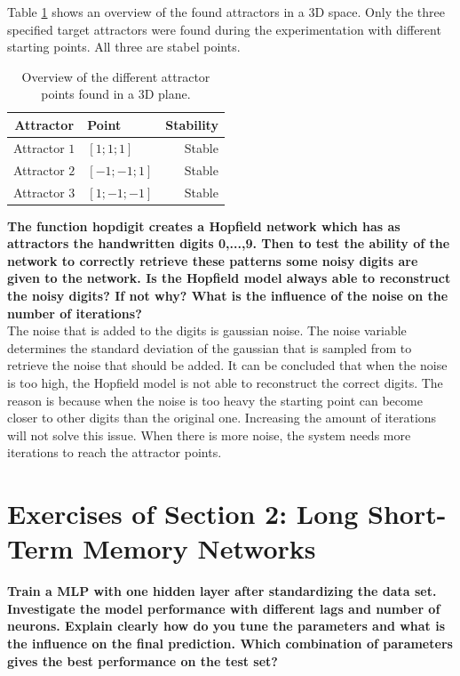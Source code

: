 \documentclass[a4paper,10pt]{article}
\begin{document}
Table \ref{tab:att3} shows an overview of the found attractors in a 3D space. Only the three specified target attractors were found during the experimentation with different starting points. All three are stabel points. 
\begin{table}
	\centering
	\begin{tabular}{@{}clr@{}} \toprule
		\textbf{Attractor} & \textbf{Point} & \textbf{Stability}\\\midrule
		Attractor $ 1 $ & $ [1;1;1] $ & Stable\\
		Attractor $ 2 $ & $ [-1;-1;1] $ & Stable\\
		Attractor $ 3 $ & $ [1;-1;-1] $ & Stable\\\bottomrule
	\end{tabular}
	\caption{Overview of the different attractor points found in a 3D plane.}
	\label{tab:att3}
\end{table}
\newpage
\textbf{The function hopdigit creates a Hopfield network which has as attractors the handwritten digits 0,...,9. Then to test
	the ability of the network to correctly retrieve these patterns some noisy digits are given to the network. Is the Hopfield
	model always able to reconstruct the noisy digits? If not why? What is the influence of the noise on the number of
	iterations?}\\

The noise that is added to the digits is gaussian noise. The noise variable determines the standard deviation of the gaussian that is sampled from to retrieve the noise that should be added. It can be concluded that when the noise is too high, the Hopfield model is not able to reconstruct the correct digits. The reason is because when the noise is too heavy the starting point can become closer to other digits than the original one. Increasing the amount of iterations will not solve this issue. When there is more noise, the system needs more iterations to reach the attractor points.

\section{Exercises of Section 2: Long Short-Term Memory Networks}
\textbf{Train a MLP with one hidden layer after standardizing the data set. Investigate the model
performance with different lags and number of neurons. Explain clearly how do you tune the parameters and what is the influence on the final prediction. Which combination of parameters gives the best performance on the test set?}\\
\end{document}
